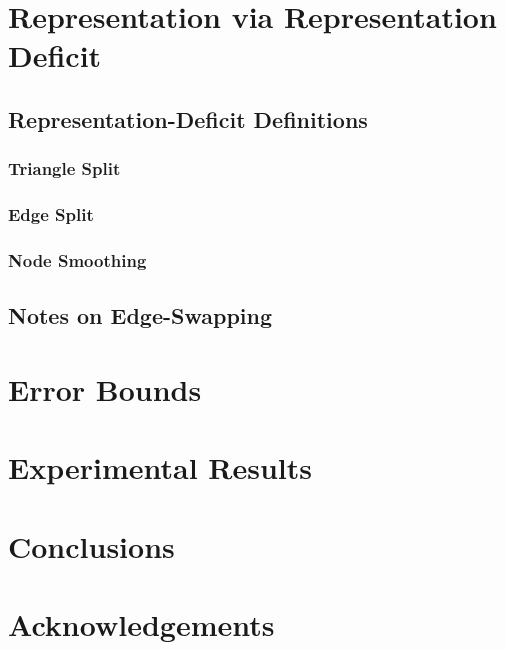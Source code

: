 \documentclass[11pt]{article}
\begin{document}
\section{Representation via Representation Deficit}
\subsection{Representation-Deficit Definitions}
\subsubsection{Triangle Split}
\subsubsection{Edge Split}
\subsubsection{Node Smoothing}
\subsection{Notes on Edge-Swapping}
\section{Error Bounds}
\section{Experimental Results}
\section{Conclusions}
\section{Acknowledgements}
\end{document}

